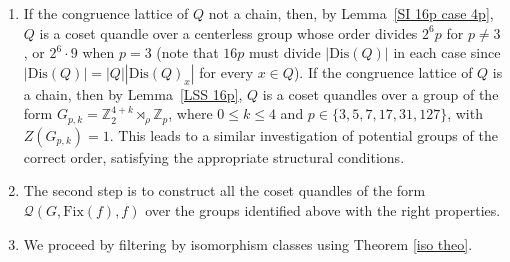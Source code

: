 \documentclass[a4paper, english, 9pt]{amsart}
\theoremstyle{plain}
\theoremstyle{definition}
\def\dis{\mathrm{Dis}}
\def\fix{\mathrm{Fix}}
\begin{document}
\begin{enumerate}
    \item 
    If the congruence lattice of $Q$ not a chain, then, by Lemma~\ref{SI 16p case 4p}, $Q$ is a coset quandle over a centerless group whose order divides $2^6 p$ for $p \neq 3$, or $2^6 \cdot 9$ when $p = 3$ (note that $16p$ must divide $|\dis(Q)|$ in each case since $|\dis(Q)|=|Q||\dis(Q)_x|$ for every $x\in Q$). %
    If the congruence lattice of $Q$ is a chain, then by Lemma~\ref{LSS 16p}, $Q$ is a coset quandles over a group of the form $G_{p,k} = \mathbb{Z}_2^{4+k} \rtimes_\rho \mathbb{Z}_p$, where $0 \leq k \leq 4$ and $p \in \{3, 5, 7, 17, 31, 127\}$, with $Z(G_{p,k}) = 1$. This leads to a similar investigation of potential groups of the correct order, satisfying the appropriate structural conditions.


    \item The second step is to construct all the coset quandles of the form $\mathcal{Q}(G, \fix(f), f)$ over the groups  identified above with the right properties.
    
    \item We proceed by filtering by isomorphism classes using Theorem \ref{iso theo}. 
    \end{enumerate}
    
\end{document}
